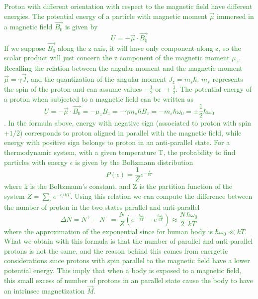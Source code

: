 \documentclass[11pt]{report}
\begin{document}
\textcolor{ForestGreen}{
Proton with different orientation with respect to the magnetic field have different energies.
The potential energy of a particle with magnetic moment $\vec{\mu}$ immersed in a magnetic field $\vec{B_0}$ is given by
\begin{equation}
U = -  \vec{\mu} \cdot \vec{B_0}
\end{equation}
If we suppose $\vec{B_0}$ along the z axis, it will have only component along z, so the scalar product will just concern the z component of the magnetic moment $\mu_z$.
Recalling the relation between the angular moment and the magnetic moment $\vec{\mu} = \gamma \vec{J}$, and the quantization of the angular moment $J_z = m_s \hbar$.
$m_s$ represents the spin of the proton and can assume values $-\frac{1}{2} \text{ or } +\frac{1}{2}$.
The potential energy of a proton when subjected to a magnetic field can be written as
\begin{equation}
U = -\vec{\mu} \cdot \vec{B_0} = - \mu_z B_z = - \gamma m_s \hbar B_z = - m_s \hbar \omega_0 = \pm \frac{1}{2} \hbar \omega_0
\end{equation}.
In the formula above, energy with negative sign (associated to proton with spin $+1/2$) corresponds to proton aligned in parallel with the magnetic field, while energy with positive sign belongs to proton in an anti-parallel state.
For a thermodynamic system, with a given temperature T, the probability to find particles with energy $\epsilon$ is given by the Boltzmann distribution
\begin{equation}
P(\epsilon) = \frac{1}{Z} e^{-\frac{\epsilon}{kT}}
\end{equation}
where k is the Boltzmann's constant, and Z is the partition function of the system $Z = \sum_\epsilon e^{-\epsilon/kT}$.
Using this relation we can compute the difference between the number of proton in the two states parallel and anti-parallel
\begin{equation}
\Delta N = N^+ - N^- = \frac{N}{Z}(e^{-\frac{\hbar \omega_0}{kT}} - e^{\frac{\hbar \omega_0}{kT}}) \approx \frac{N}{2}\frac{\hbar \omega_0}{kT}
\end{equation}
where the approximation of the exponential since for human body is $\hbar \omega_0 \ll kT$.
What we obtain with this formula is that the number of parallel and anti-parallel protons is not the same, and the reason behind this comes from energetic considerations since protons with spin parallel to the magnetic field have a lower potential energy.
This imply that when a body is exposed to a magnetic field, this small excess of number of protons in an parallel state cause the body to have an intrinsec magnetization $\vec{M}$.
}
\end{document}
